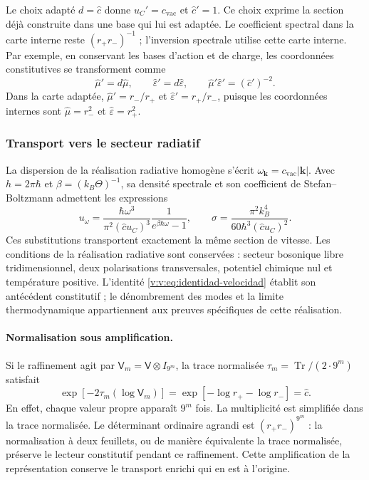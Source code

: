 Le choix adapté $d=\widehat c$ donne $u_C'=c_{\mathrm{vac}}$ et
$\widehat c'=1$. Ce choix exprime la section déjà construite dans une
base qui lui est adaptée. Le coefficient spectral dans la carte interne reste
$(r_+r_-)^{-1}$ ; l’inversion spectrale utilise cette carte interne.
Par exemple, en conservant les bases d’action et de charge, les coordonnées
constitutives se transforment comme
\[
 \widehat\mu'=d\widehat\mu,
 \qquad \widehat\varepsilon'=d\widehat\varepsilon,
 \qquad
 \widehat\mu'\widehat\varepsilon'=(\widehat c')^{-2}.
\]
Dans la carte adaptée, $\widehat\mu'=r_-/r_+$ et
$\widehat\varepsilon'=r_+/r_-$, puisque les coordonnées internes sont
$\widehat\mu=r_-^2$ et $\widehat\varepsilon=r_+^2$.

\subsubsection{Transport vers le secteur radiatif}

La dispersion de la réalisation radiative homogène s’écrit
$\omega_{\symbf{k}}=c_{\mathrm{vac}}|\symbf{k}|$.
Avec $h=2\pi\hbar$ et $\beta=(k_B\Theta)^{-1}$, sa densité spectrale
et son coefficient de Stefan--Boltzmann admettent les expressions
\begin{equation}
 u_\omega=
 \frac{\hbar\omega^3}{\pi^2(\widehat c u_C)^3}
 \frac{1}{e^{\beta\hbar\omega}-1},
 \qquad
 \sigma=\frac{\pi^2k_B^4}{60\hbar^3(\widehat c u_C)^2}.
 \label{v:v:eq:radiacion-velocidad-constitutiva}
\end{equation}
Ces substitutions transportent exactement la même section de
vitesse. Les conditions de la réalisation radiative sont conservées :
secteur bosonique libre tridimensionnel, deux polarisations transversales,
potentiel chimique nul et température positive. L’identité
\eqref{v:v:eq:identidad-velocidad} établit son antécédent constitutif ;
le dénombrement des modes et la limite thermodynamique appartiennent aux preuves
spécifiques de cette réalisation.

\paragraph{Normalisation sous amplification.}
Si le raffinement agit par $\mathsf V_m=\mathsf V\otimes I_{9^m}$,
la trace normalisée $\tau_m=\operatorname{Tr}/(2\cdot9^m)$ satisfait
\[
 \exp[-2\tau_m(\log\mathsf V_m)]
 =\exp[-\log r_+-\log r_-]=\widehat c.
\]
En effet, chaque valeur propre apparaît $9^m$ fois. La multiplicité est
simplifiée dans la trace normalisée. Le déterminant ordinaire agrandi est
$(r_+r_-)^{9^m}$ : la normalisation à deux feuillets, ou de manière équivalente la
trace normalisée, préserve le lecteur constitutif pendant ce
raffinement. Cette amplification de la représentation conserve le
transport enrichi qui en est à l’origine.

